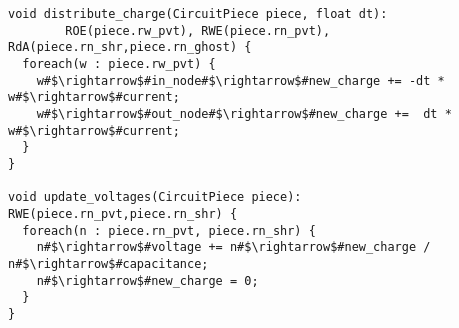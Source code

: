 \begin{lstlisting}[float={t},label={lst:code_ex},caption={Circuit simulation.}]
void distribute_charge(CircuitPiece piece, float dt):
        ROE(piece.rw_pvt), RWE(piece.rn_pvt), RdA(piece.rn_shr,piece.rn_ghost) {
  foreach(w : piece.rw_pvt) {
    w#$\rightarrow$#in_node#$\rightarrow$#new_charge += -dt * w#$\rightarrow$#current;
    w#$\rightarrow$#out_node#$\rightarrow$#new_charge +=  dt * w#$\rightarrow$#current;
  }
}

void update_voltages(CircuitPiece piece): RWE(piece.rn_pvt,piece.rn_shr) {
  foreach(n : piece.rn_pvt, piece.rn_shr) {
    n#$\rightarrow$#voltage += n#$\rightarrow$#new_charge / n#$\rightarrow$#capacitance;
    n#$\rightarrow$#new_charge = 0;
  }
}
\end{lstlisting}
